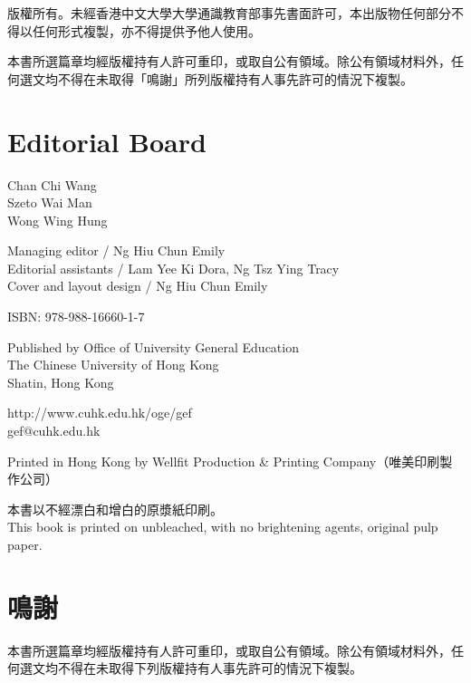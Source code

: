 \documentclass[UTF8,zihao=-4]{ctexart}
\begin{document}
\vspace{1em}

\noindent 版權所有。未經香港中文大學大學通識教育部事先書面許可，本出版物任何部分不得以任何形式複製，亦不得提供予他人使用。

\noindent 本書所選篇章均經版權持有人許可重印，或取自公有領域。除公有領域材料外，任何選文均不得在未取得「鳴謝」所列版權持有人事先許可的情況下複製。

\section*{Editorial Board}
Chan Chi Wang\\
Szeto Wai Man\\
Wong Wing Hung

\vspace{1em}

\noindent Managing editor / Ng Hiu Chun Emily\\
Editorial assistants / Lam Yee Ki Dora, Ng Tsz Ying Tracy\\
Cover and layout design / Ng Hiu Chun Emily

\vspace{1em}

\noindent ISBN: 978-988-16660-1-7

\vspace{1em}

\noindent Published by Office of University General Education\\
The Chinese University of Hong Kong\\
Shatin, Hong Kong

\vspace{1em}

\noindent http://www.cuhk.edu.hk/oge/gef\\
gef@cuhk.edu.hk

\vspace{1em}

\noindent Printed in Hong Kong by Wellfit Production \& Printing Company（唯美印刷製作公司）

\vspace{1em}

\noindent 本書以不經漂白和增白的原漿紙印刷。\\
This book is printed on unbleached, with no brightening agents, original pulp paper.

\section*{鳴謝}
\noindent 本書所選篇章均經版權持有人許可重印，或取自公有領域。除公有領域材料外，任何選文均不得在未取得下列版權持有人事先許可的情況下複製。
\end{document}
